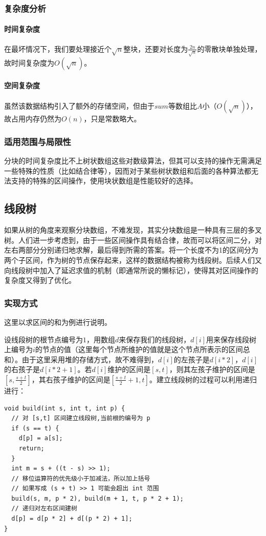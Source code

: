 \documentclass{cjc}
\begin{document}
\subsubsection{复杂度分析}
\paragraph{时间复杂度} 在最坏情况下，我们要处理接近个$\sqrt{n}$整块，还要对长度为$\frac{2n}{\sqrt{n}}$的零散块单独处理，故时间复杂度为$O(\sqrt{n})$。
\paragraph{空间复杂度} 虽然该数据结构引入了额外的存储空间，但由于$sum$等数组比$A$小（$O(\sqrt{n})$），故占用内存仍然为$O(n)$，只是常数略大。
\subsubsection{适用范围与局限性}
分块的时间复杂度比不上树状数组这些对数级算法，但其可以支持的操作无需满足一些特殊的性质（比如结合律等），因而对于某些树状数组和后面的各种算法都无法支持的特殊的区间操作，使用块状数组是性能较好的选择。

\subsection{线段树}

如果从树的角度来观察分块数组，不难发现，其实分块数组是一种具有三层的多叉树。人们进一步考虑到，由于一些区间操作具有结合律，故而可以将区间二分，对左右两部分分别递归地求解，最后得到所需的答案。将一个长度不为1的区间分为两个子区间，作为树的节点保存起来，这样的数据结构被称为线段树。后续人们又向线段树中加入了延迟求值的机制（即通常所说的懒标记），使得其对区间操作的复杂度又得到了优化。

\subsubsection{实现方式}
这里以求区间的和为例进行说明。

设线段树的根节点编号为$1$，用数组$d$来保存我们的线段树，$d[i]$用来保存线段树上编号为$i$的节点的值（这里每个节点所维护的值就是这个节点所表示的区间总和）。由于这里采用堆的存储方式，故不难得到，$d[i]$的左孩子是$d[i*2]$，$d[i]$的右孩子是$d[i*2+1]$。若$d[i]$维护的区间是$[s,t]$，则其左孩子维护的区间是$[s,\frac{s+t}{2}]$，其右孩子维护的区间是$[\frac{s+t}{2}+1,t]$。建立线段树的过程可以利用递归进行：
\begin{lstlisting}
void build(int s, int t, int p) {
  // 对 [s,t] 区间建立线段树,当前根的编号为 p
  if (s == t) {
    d[p] = a[s];
    return;
  }
  int m = s + ((t - s) >> 1);
  // 移位运算符的优先级小于加减法，所以加上括号
  // 如果写成 (s + t) >> 1 可能会超出 int 范围
  build(s, m, p * 2), build(m + 1, t, p * 2 + 1);
  // 递归对左右区间建树
  d[p] = d[p * 2] + d[(p * 2) + 1];
}
\end{lstlisting}
\end{document}
